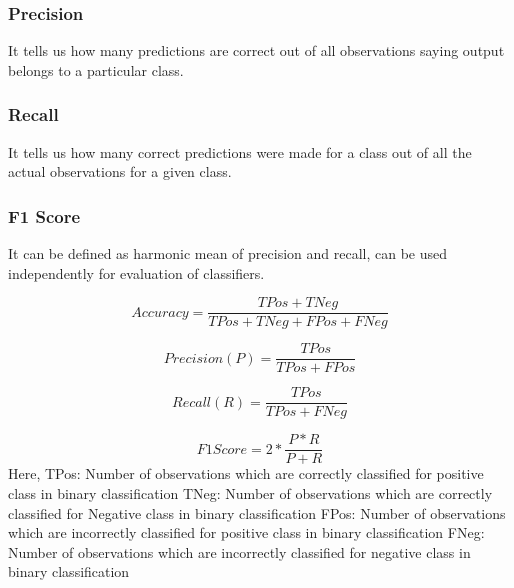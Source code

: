 \documentclass[conference]{IEEEtran}
\begin{document}
\subsubsection{Precision}
\label{subsubsection:precision}
It tells us how many predictions are correct out of all observations saying output belongs to a particular class.

\subsubsection{Recall}
\label{subsubsection:recall}
It tells us how many correct predictions were made for a class out of all the actual observations for a given class.

\subsubsection{F1 Score}
\label{subsubsection:f1score}
It can be defined as harmonic mean of precision and recall, can be used independently for evaluation of classifiers.


\begin{equation}
\label{equation:accuracy}
    Accuracy = \frac{TPos + TNeg}{TPos + TNeg + FPos + FNeg}
\end{equation}

\begin{equation}
\label{equation:precision}
    Precision(P) = \frac{TPos}{TPos + FPos}
\end{equation}

\begin{equation}
\label{equation:recall}
    Recall(R) = \frac{TPos}{TPos + FNeg}
\end{equation}

\begin{equation}
\label{equation:f1Score}
    F1 Score = 2*\frac{P*R}{P+R}
\end{equation}
Here,\newline
TPos: Number of observations which are correctly classified for positive class in binary classification \newline
TNeg: Number of observations which are correctly classified for Negative class in binary classification \newline
FPos: Number of observations which are incorrectly classified for positive class in binary classification \newline
FNeg: Number of observations which are incorrectly classified for negative class in binary classification \newline
\end{document}
